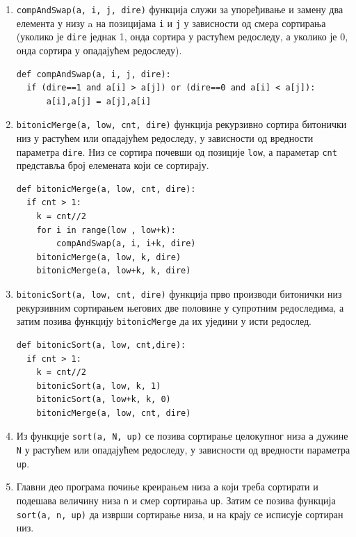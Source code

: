 \documentclass[12pt, a4paper]{article}
\theoremstyle{definition}
\begin{document}
\begin{enumerate}
\item \verb+compAndSwap(a, i, j, dire)+ функција служи за упоређивање и замену два елемента у низу a на позицијама \verb+i+ и \verb+j+ у зависности од смера сортирања (уколико је \verb+dire+ једнак 1, онда сортира у растућем редоследу, а уколико је 0, онда сортира у опадајућем редоследу).
\begin{verbatim}
def compAndSwap(a, i, j, dire):
  if (dire==1 and a[i] > a[j]) or (dire==0 and a[i] < a[j]):
      a[i],a[j] = a[j],a[i]
\end{verbatim}


\item \verb+bitonicMerge(a, low, cnt, dire)+ функција рекурзивно сортира битонички низ у растућем или опадајућем редоследу, у зависности од вредности параметра \verb+dire+. Низ се сортира почевши од позиције \verb+low+, а параметар \verb+cnt+ представља број елемената који се сортирају.
\begin{verbatim}
def bitonicMerge(a, low, cnt, dire):
  if cnt > 1:
    k = cnt//2
    for i in range(low , low+k):
        compAndSwap(a, i, i+k, dire)
    bitonicMerge(a, low, k, dire)
    bitonicMerge(a, low+k, k, dire)
\end{verbatim}
\item \verb+bitonicSort(a, low, cnt, dire)+ функција прво производи битонички низ рекурзивним сортирањем његових две половине у супротним редоследима, а затим позива функцију \verb+bitonicMerge+ да их уједини у исти редослед.
\begin{verbatim}
def bitonicSort(a, low, cnt,dire):
  if cnt > 1:
    k = cnt//2
    bitonicSort(a, low, k, 1)
    bitonicSort(a, low+k, k, 0)
    bitonicMerge(a, low, cnt, dire)
\end{verbatim}


\item Из функције \verb+sort(a, N, up)+ се позива сортирање целокупног низа \verb+a+ дужине \verb+N+ у растућем или опадајућем редоследу, у зависности од вредности параметра \verb+up+.

\item Главни део програма почиње креирањем низа \verb+a+ који треба сортирати и подешава величину низа \verb+n+ и смер сортирања \verb+up+. Затим се позива функција \verb+sort(a, n, up)+ да изврши сортирање низа, и на крају се исписује сортиран низ.

\end{enumerate}

\newpage
\end{document}
